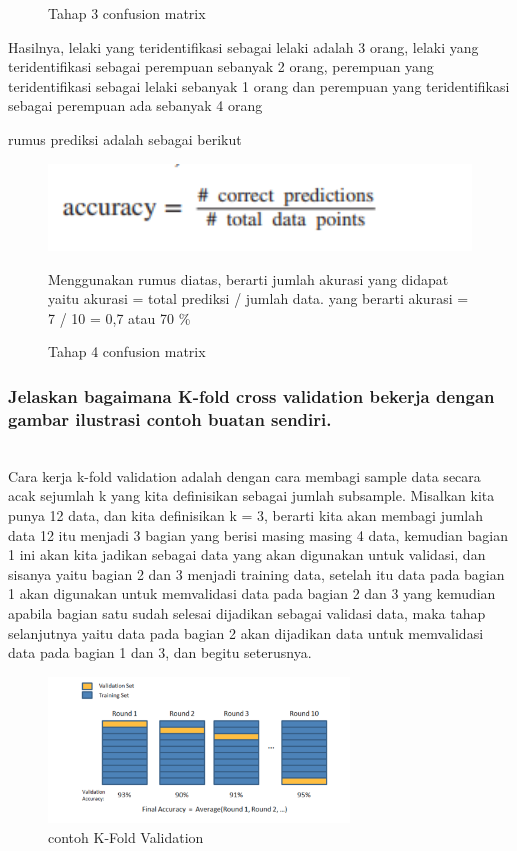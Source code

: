 \begin{enumerate}
\begin{figure}[H]
    \centering
    \caption{Tahap 3 confusion matrix}
\end{figure}	
    \item Hasilnya, lelaki yang teridentifikasi sebagai lelaki adalah 3 orang, lelaki yang teridentifikasi sebagai perempuan sebanyak 2 orang, perempuan yang teridentifikasi sebagai lelaki sebanyak 1 orang dan perempuan yang teridentifikasi sebagai perempuan ada sebanyak 4 orang
    \item rumus prediksi adalah sebagai berikut 
\begin{figure}[H]
    \includegraphics[width=12cm]{figures/1174079/2/confusionmatrixcara4.PNG}
    \centering
    \caption{Tahap 4 confusion matrix}
   \item Menggunakan rumus diatas, berarti jumlah akurasi yang didapat yaitu akurasi = total prediksi / jumlah data. yang berarti akurasi = 7 / 10 = 0,7 atau 70 \%
\end{figure}	
\end{enumerate}

\subsubsection{Jelaskan bagaimana K-fold cross validation bekerja dengan gambar ilustrasi contoh buatan sendiri.}
\hfill\\
Cara kerja k-fold validation adalah dengan cara membagi sample data secara acak sejumlah k yang kita definisikan sebagai jumlah subsample. Misalkan kita punya 12 data, dan kita definisikan k = 3, berarti kita akan membagi jumlah data 12 itu menjadi 3 bagian yang berisi masing masing 4 data, kemudian bagian 1 ini akan kita jadikan sebagai data yang akan digunakan untuk validasi, dan sisanya yaitu bagian 2 dan 3 menjadi training data, setelah itu data pada bagian 1 akan digunakan untuk memvalidasi data pada bagian 2 dan 3 yang kemudian apabila bagian satu sudah selesai dijadikan sebagai validasi data, maka tahap selanjutnya yaitu data pada bagian 2 akan dijadikan data untuk memvalidasi data pada bagian 1 dan 3, dan begitu seterusnya.
\begin{figure}[H]
    \includegraphics[width=8cm]{figures/1174079/2/kfold.PNG}
    \centering
    \caption{contoh K-Fold Validation}
\end{figure}

